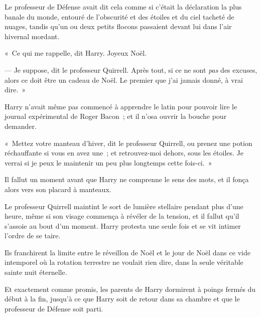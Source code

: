 Le professeur de Défense avait dit cela comme si c'était la déclaration la plus banale du monde, entouré de l'obscurité et des étoiles et du ciel tacheté de nuages, tandis qu'un ou deux petits flocons passaient devant lui dans l'air hivernal mordant.

«~Ce qui me rappelle, dit Harry.
Joyeux Noël.

--- Je suppose, dit le professeur Quirrell.
Après tout, si ce ne sont \emph{pas} des excuses, alors ce doit être un cadeau de Noël.
Le premier que j'ai jamais donné, à vrai dire.~»

Harry n'avait même pas commencé à apprendre le latin pour pouvoir lire le journal expérimental de Roger Bacon~; et il n'osa ouvrir la bouche pour demander.

«~Mettez votre manteau d'hiver, dit le professeur Quirrell, ou prenez une potion réchauffante si vous en avez une~; et retrouvez-moi dehors, sous les étoiles.
Je verrai si je peux le maintenir un peu plus longtemps cette fois-ci.~»

Il fallut un moment avant que Harry ne comprenne le sens des mots, et il fonça alors vers son placard à manteaux.

Le professeur Quirrell maintint le sort de lumière stellaire pendant plus d'une heure, même si son visage commença à révéler de la tension, et il fallut qu'il s'assoie au bout d'un moment.
Harry protesta une seule fois et se vit intimer l'ordre de se taire.

Ils franchirent la limite entre le réveillon de Noël et le jour de Noël dans ce vide intemporel où la rotation terrestre ne voulait rien dire, dans la seule véritable sainte nuit éternelle.

Et exactement comme promis, les parents de Harry dormirent à poings fermés du début à la fin, jusqu'à ce que Harry soit de retour dans sa chambre et que le professeur de Défense soit parti.
